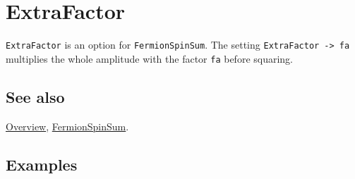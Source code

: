 \documentclass[../FeynCalcManual.tex]{subfiles}
\begin{document}
\hypertarget{extrafactor}{%
\section{ExtraFactor}\label{extrafactor}}

\texttt{ExtraFactor} is an option for \texttt{FermionSpinSum}. The
setting \texttt{ExtraFactor -> fa} multiplies the whole amplitude with
the factor \texttt{fa} before squaring.

\subsection{See also}

\hyperlink{toc}{Overview}, \hyperlink{fermionspinsum}{FermionSpinSum}.

\subsection{Examples}
\end{document}
